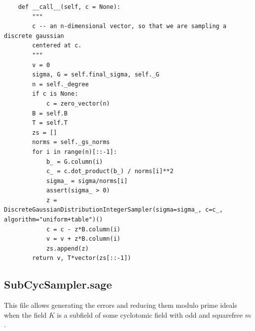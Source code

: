 \documentclass[envcountsame]{llncs}
\begin{document}
\begin{verbatim}
    def __call__(self, c = None):
        """
        c -- an n-dimensional vector, so that we are sampling a discrete gaussian
        centered at c.
        """
        v = 0
        sigma, G = self.final_sigma, self._G
        n = self._degree
        if c is None:
            c = zero_vector(n)
        B = self.B
        T = self.T
        zs = []
        norms = self._gs_norms
        for i in range(n)[::-1]:
            b_ = G.column(i)
            c_ = c.dot_product(b_) / norms[i]**2
            sigma_ = sigma/norms[i]
            assert(sigma_ > 0)
            z = DiscreteGaussianDistributionIntegerSampler(sigma=sigma_, c=c_, algorithm="uniform+table")()
            c = c - z*B.column(i)
            v = v + z*B.column(i)
            zs.append(z)
        return v, T*vector(zs[::-1])
\end{verbatim}

\subsection{SubCycSampler.sage}

\normalsize This file allows generating the errors and reducing them modulo prime ideals when the field $K$ is a subfield of some cyclotomic field with
odd and squarefree $m$.
\end{document}
